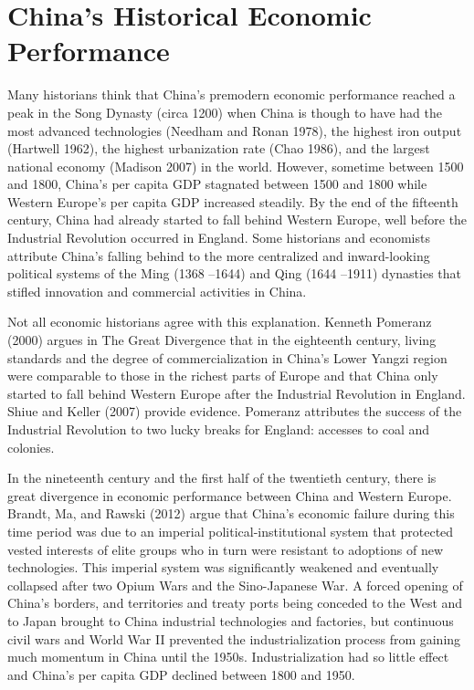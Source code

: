 \documentclass{article}
\begin{document}
    \section*{China’s Historical Economic Performance}
    Many historians think that China’s premodern economic performance reached a peak in the Song Dynasty (circa 1200) when China is though to have had the most advanced technologies (Needham and Ronan 1978), the highest iron output (Hartwell 1962), the highest urbanization rate (Chao 1986), and the largest national economy (Madison 2007) in the world. However, sometime between 1500 and 1800, China’s per capita GDP stagnated between 1500 and 1800 while Western Europe’s per capita GDP increased steadily. By the end of the fifteenth century, China had already started to fall behind Western Europe, well before the Industrial Revolution occurred in England. Some historians and economists attribute China’s falling behind to the more centralized and inward-looking political systems of the Ming (1368 –1644) and Qing (1644 –1911) dynasties that stifled innovation and commercial activities in China.

    Not all economic historians agree with this explanation. Kenneth Pomeranz (2000) argues in The Great Divergence that in the eighteenth century, living standards and the degree of commercialization in China’s Lower Yangzi region were comparable to those in the richest parts of Europe and that China only started to fall behind Western Europe after the Industrial Revolution in England. Shiue and Keller (2007) provide evidence. Pomeranz attributes the success of the Industrial Revolution to two lucky breaks for England: accesses to coal and colonies.

    In the nineteenth century and the first half of the twentieth century, there is great divergence in economic performance between China and Western Europe. Brandt, Ma, and Rawski (2012) argue that China’s economic failure during this time period was due to an imperial political-institutional system that protected vested interests of elite groups who in turn were resistant to adoptions of new technologies. This imperial system was significantly weakened and eventually collapsed after two Opium Wars and the Sino-Japanese War. A forced opening of China’s borders, and territories and treaty ports being conceded to the West and to Japan brought to China industrial technologies and factories, but continuous civil wars and World War II prevented the industrialization process from gaining much momentum in China until the 1950s.  Industrialization had so little effect and China’s per capita GDP declined between 1800 and 1950.
\end{document}
